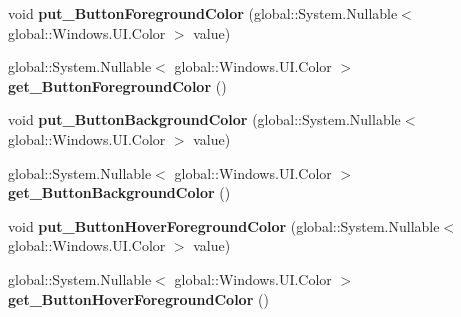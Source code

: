 \begin{DoxyCompactItemize}
void {\bfseries put\+\_\+\+Button\+Foreground\+Color} (global\+::\+System.\+Nullable$<$ global\+::\+Windows.\+U\+I.\+Color $>$ value)
\item 
\mbox{\label{interface_windows_1_1_u_i_1_1_view_management_1_1_i_application_view_title_bar_a1e98b68f7deda40dcc079398e337b879}} 
global\+::\+System.\+Nullable$<$ global\+::\+Windows.\+U\+I.\+Color $>$ {\bfseries get\+\_\+\+Button\+Foreground\+Color} ()
\item 
\mbox{\label{interface_windows_1_1_u_i_1_1_view_management_1_1_i_application_view_title_bar_aa30ceb6cb754d6fe22cc1f9349cec11c}} 
void {\bfseries put\+\_\+\+Button\+Background\+Color} (global\+::\+System.\+Nullable$<$ global\+::\+Windows.\+U\+I.\+Color $>$ value)
\item 
\mbox{\label{interface_windows_1_1_u_i_1_1_view_management_1_1_i_application_view_title_bar_a4c1cd45075a51fbe4b7c200617ff974c}} 
global\+::\+System.\+Nullable$<$ global\+::\+Windows.\+U\+I.\+Color $>$ {\bfseries get\+\_\+\+Button\+Background\+Color} ()
\item 
\mbox{\label{interface_windows_1_1_u_i_1_1_view_management_1_1_i_application_view_title_bar_a70edac05b4d8c02ec835656bd77600ee}} 
void {\bfseries put\+\_\+\+Button\+Hover\+Foreground\+Color} (global\+::\+System.\+Nullable$<$ global\+::\+Windows.\+U\+I.\+Color $>$ value)
\item 
\mbox{\label{interface_windows_1_1_u_i_1_1_view_management_1_1_i_application_view_title_bar_a8e5e568a776ecf6968851eb773d8b3a0}} 
global\+::\+System.\+Nullable$<$ global\+::\+Windows.\+U\+I.\+Color $>$ {\bfseries get\+\_\+\+Button\+Hover\+Foreground\+Color} ()
\item 
\mbox{\label{interface_windows_1_1_u_i_1_1_view_management_1_1_i_application_view_title_bar_ac3bb322995b31276ea3d74f26c96bf61}} 

\end{DoxyCompactItemize}
